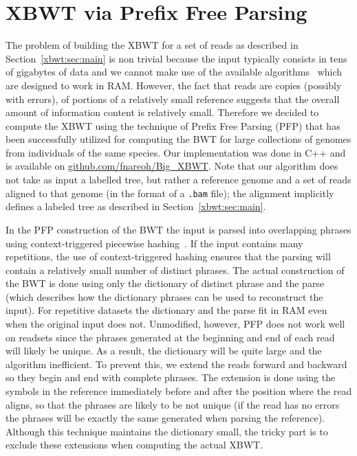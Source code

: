 

\section{XBWT via Prefix Free Parsing}\label{xbwt:sec:pfp}

The problem of building the XBWT for a set of reads as described in Section~\ref{xbwt:sec:main} is non trivial because the input typically consists in tens of gigabytes of data and we cannot make use of the available algorithms~\cite{JarnoSODA20,DBLP:conf/dcc/BaierBOW20} which are designed to work in RAM. However, the fact that reads are copies (possibly with errors), of portions of a relatively small reference suggests that the overall amount of information content is relatively small. Therefore we decided to compute the XBWT using the technique of Prefix Free Parsing (PFP) that has been successfully utilized for computing the BWT for large collections 
of genomes from individuals of the same species. Our implementation was done in C++ and is available on \href{https://github.com/fnareoh/Big_XBWT}{ github.com/fnareoh/Big\_XBWT}. {Note that our algorithm does not take as input a labelled tree, but rather a reference genome and a set of reads aligned to that genome (in the format of a {\tt .bam} file); the alignment implicitly defines a labeled tree as described in Section~\ref{xbwt:sec:main}.}


{In the PFP construction of the BWT the input is parsed into overlapping phrases using context-triggered piecewise hashing~\cite{boucher2019prefix}. If the input contains many repetitions, the use of context-triggered hashing ensures that the parsing will contain a relatively small number of distinct phrases. The actual construction of the BWT is done using only the dictionary of distinct phrase and the parse (which describes how the dictionary phrases can be used to reconstruct the input). For repetitive datasets the dictionary and the parse fit in RAM even when the original input does not.} Unmodified, however, PFP does not work well on readsets since the phrases generated at the beginning and end of each read will likely be unique. As a result, the dictionary will be quite large and the algorithm inefficient. To prevent this, we extend the reads forward and backward so they begin and end with complete phrases. The extension is done using the symbols in the reference immediately before and after the position where the read aligns, so that the phrases are likely to be not unique (if the read has no errors the phrases will be exactly the same generated when parsing the reference). Although this technique maintains the dictionary small, the tricky part is to exclude these extensions when computing the actual XBWT.

